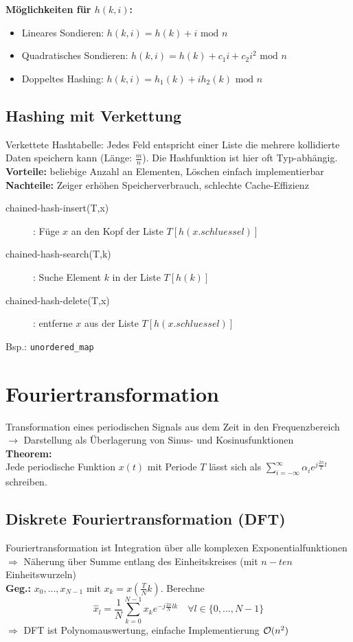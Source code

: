 \documentclass[fs, footer]{latex4ei}
\renewcommand{\t}{\texttt}
\begin{document}
\begin{multicols*}{4}
{{	\textbf{Möglichkeiten für $h(k,i)$:}
	\begin{itemize}
		\item Lineares Sondieren: $h(k,i)=h(k)+i\text{ mod }n$
		\item Quadratisches Sondieren: $h(k,i)=h(k)+c_1i+c_2i^2 \text{ mod } n$
		\item Doppeltes Hashing: $h(k,i)=h_1(k)+ih_2(k) \text{ mod } n$
	\end{itemize}
\subsection{Hashing mit Verkettung}
Verkettete Hashtabelle: Jedes Feld entspricht einer Liste die mehrere kollidierte Daten speichern kann (Länge: $\frac{m}{n}$). Die Hashfunktion ist hier oft Typ-abhängig.\\
	\textbf{Vorteile:} beliebige Anzahl an Elementen, Löschen einfach implementierbar \\
	\textbf{Nachteile:} Zeiger erhöhen Speicherverbrauch, schlechte Cache-Effizienz
	\\

\begin{description}
	\item[chained-hash-insert(T,x)]: Füge $x$ an den Kopf der Liste $T[ h(x.schluessel)]$
	\item[chained-hash-search(T,k)]: Suche Element $k$ in der Liste $T[ h(k) ]$
	\item[chained-hash-delete(T,x)]: entferne $x$ aus der Liste $T[h(x.schluessel)]$
\end{description}
Bsp.: \t{unordered\_map}

\section{Fouriertransformation}
Transformation eines periodischen Signals aus dem Zeit in den Frequenzbereich $\rightarrow$ Darstellung als Überlagerung von Sinus- und Kosinusfunktionen\\
\textbf{Theorem:}\\
Jede periodische Funktion $x(t)$ mit Periode $T$ lässt sich als $\sum_{i=-\infty}^\infty \alpha_i e^{j\frac{2\pi}{T}t}$ schreiben.
\subsection{Diskrete Fouriertransformation (DFT)}
Fouriertransformation ist Integration über alle komplexen Exponentialfunktionen $\Rightarrow$ Näherung über Summe entlang des Einheitskreises (mit $n-ten$ Einheitswurzeln)\\
\textbf{Geg.:} $x_0, ..., x_{N-1}$ mit $x_k = x(\frac{T}{N}k)$.
Berechne \[\hat{x}_l = \dfrac{1}{N} \sum_{k=0}^{N-1}x_ke^{-j\frac{2\pi}{N}lk}\quad\forall l \in \{0,...,N-1\}\]
$\Rightarrow$ DFT ist Polynomauswertung, einfache Implementierung $\operatorname{\mathcal O}(n^2)$
}}
\end{multicols*}
\end{document}
